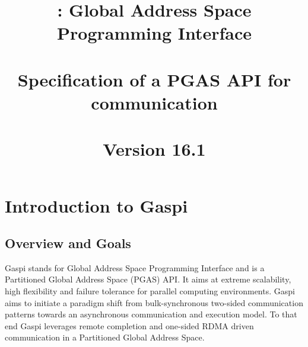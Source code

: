 \documentclass[a4paper]{article}
\title{\GASPI{}: Global Address Space Programming Interface\\
~\\
Specification of a PGAS API for communication\\
~\\
Version 16.1
}
\makeatletter
\newlength{\st}\setlength{\st}{0pt}
\newcommand{\GASPI}{{\sc Gaspi}}
\newcounter{counttodo}
\newlength{\savetabcolsep}
\newlength{\savearrayrulewidth}
\newenvironment{todo}
{\stepcounter{counttodo}
 \typeout{Environment TODO call \thecounttodo}
 \setlength{\savetabcolsep}{\tabcolsep}
 \setlength{\savearrayrulewidth}{\arrayrulewidth}
 \renewcommand{\tabcolsep}{0pt}
 \renewcommand{\arrayrulewidth}{2pt}
 \begin{center}
 \begin{tabular}{c|l@{\hspace*{2em}}|@{\hspace*{2em}}c}
 &
 \begin{minipage}{0.66\textwidth}
 \begin{itemize}
}
{\end{itemize}
 \end{minipage}
 &  todo \#\thecounttodo
 \end{tabular} \marginpar{$\Longleftarrow$}
 \end{center}
 \renewcommand{\tabcolsep}{\savetabcolsep}
 \renewcommand{\arrayrulewidth}{\savearrayrulewidth}
}
\makeatother
\begin{document}
\begin{titlepage}
\maketitle
\end{titlepage}

\tableofcontents


\newpage



\section{Introduction to \GASPI{}}
\label{sec::Intro}

\subsection{Overview and Goals}
\label{subsec::Overview}

\GASPI{} stands for Global Address Space Programming Interface and
is a Partitioned Global Address Space (PGAS) API. It aims at
extreme scalability, high flexibility and failure tolerance for parallel
computing environments.  \GASPI{} aims
to initiate a paradigm shift from bulk-synchronous two-sided
communication patterns towards an asynchronous communication and
execution model. To that end \GASPI{} leverages remote completion and 
one-sided RDMA driven communication in a Partitioned Global Address Space.
\end{document}
